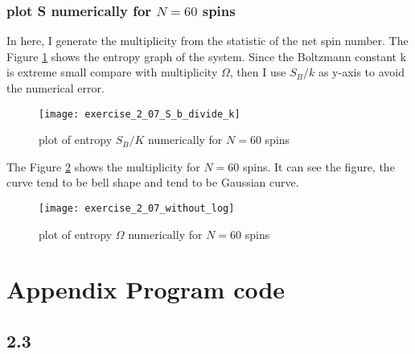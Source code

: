 \documentclass[a4paper,11pt]{article}
\begin{document}
\subsubsection{plot S numerically for $N = 60$ spins}

In here, I generate the multiplicity from the statistic of the net spin number. The Figure \ref{fig:exercise_2_07_S_b_divide_k} shows the entropy graph of the system. Since the Boltzmann constant k is extreme small compare with multiplicity $\Omega$, then I use $S_B/k$ as y-axis to avoid the numerical error.

\begin{figure}[H]
	\centering
	\texttt{[image: exercise\_2\_07\_S\_b\_divide\_k]}
	\caption{plot of entropy $S_B /K$ numerically for $N = 60$ spins}
	\label{fig:exercise_2_07_S_b_divide_k}
\end{figure}

The Figure \ref{fig:exercise207withoutlog} shows the multiplicity for $N = 60$ spins. It can see the figure,  the curve tend to be  bell shape and tend to be Gaussian curve. 
\begin{figure}[H]
	\centering
	\texttt{[image: exercise\_2\_07\_without\_log]}
	\caption{plot of entropy $\Omega$ numerically for $N = 60$ spins}
	\label{fig:exercise207withoutlog}
\end{figure}





















\section{Appendix Program code}
\subsection{2.3}

\end{document}
